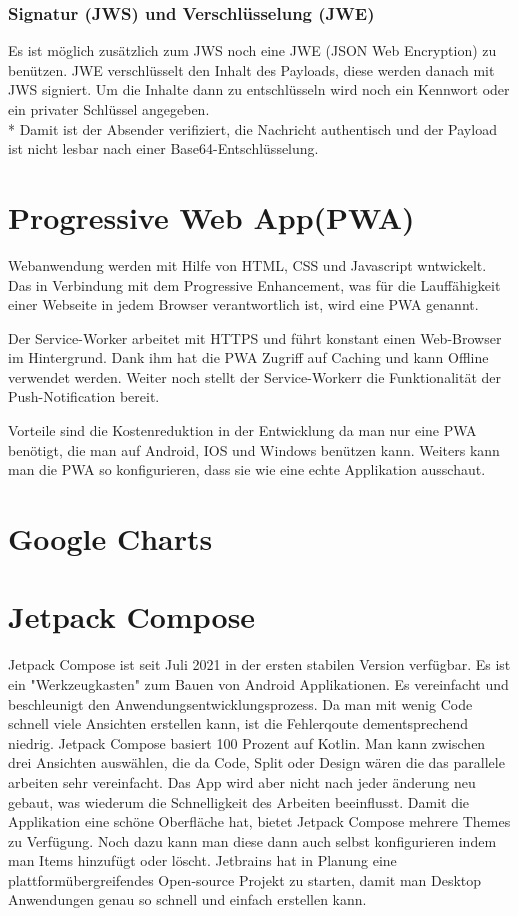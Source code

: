 \subsubsection{Signatur (JWS) und Verschlüsselung (JWE)}
Es ist möglich zusätzlich zum JWS noch eine JWE (JSON Web Encryption) zu benützen. JWE verschlüsselt den Inhalt des Payloads, diese werden danach mit JWS signiert.
Um die Inhalte dann zu entschlüsseln wird noch ein Kennwort oder ein privater Schlüssel angegeben. \\*
Damit ist der Absender verifiziert, die Nachricht authentisch und der Payload ist nicht lesbar nach einer Base64-Entschlüsselung. \cite{JWTIONOS}


\section{Progressive Web App(PWA)}
Webanwendung werden mit Hilfe von HTML, CSS und Javascript wntwickelt. 
Das in Verbindung mit dem Progressive Enhancement, was für die Lauffähigkeit einer Webseite in jedem Browser verantwortlich ist, wird eine PWA genannt. 

Der Service-Worker arbeitet mit HTTPS und führt konstant einen Web-Browser im Hintergrund.
Dank ihm hat die PWA Zugriff auf Caching und kann Offline verwendet werden. 
Weiter noch stellt der Service-Workerr die Funktionalität der Push-Notification bereit.  


Vorteile sind die Kostenreduktion in der Entwicklung da man nur eine PWA benötigt, die man auf Android, IOS und Windows benützen kann.
Weiters kann man die PWA so konfigurieren, dass sie wie eine echte Applikation ausschaut.


\section{Google Charts}

\section{Jetpack Compose}
\author{Bozidar Spasenovic}
Jetpack Compose ist seit Juli 2021 in der ersten stabilen Version verfügbar. Es ist ein "Werkzeugkasten" zum Bauen von Android Applikationen.
Es vereinfacht und beschleunigt den Anwendungsentwicklungsprozess. Da man mit wenig Code schnell viele Ansichten erstellen kann, ist die Fehlerqoute dementsprechend niedrig.
Jetpack Compose basiert 100 Prozent auf Kotlin. Man kann zwischen drei Ansichten auswählen, die da Code, Split oder Design wären die das parallele arbeiten sehr vereinfacht. 
Das App wird aber nicht nach jeder änderung neu gebaut, was wiederum die Schnelligkeit des Arbeiten beeinflusst. Damit die Applikation eine schöne Oberfläche hat, bietet
Jetpack Compose mehrere Themes zu Verfügung. Noch dazu kann man diese dann auch selbst konfigurieren indem man Items hinzufügt oder löscht.
Jetbrains hat in Planung eine plattformübergreifendes Open-source Projekt zu starten, damit man Desktop Anwendungen genau so schnell und einfach erstellen kann. 

